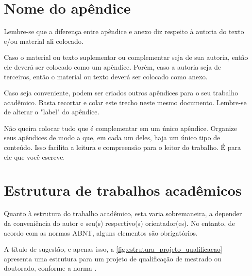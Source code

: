 
\begin{apendicesenv}
\partapendices


\chapter{Nome do apêndice}
\label{chap:apendice_a}

Lembre-se que a diferença entre apêndice e anexo diz respeito à autoria do texto e/ou material ali colocado.

Caso o material ou texto suplementar ou complementar seja de sua autoria, então ele deverá ser colocado como um apêndice. Porém, caso a autoria seja de terceiros, então o material ou texto deverá ser colocado como anexo.

Caso seja conveniente, podem ser criados outros apêndices para o seu trabalho acadêmico. Basta recortar e colar este trecho neste mesmo documento. Lembre-se de alterar o "label"{} do apêndice.

Não queira colocar tudo que é complementar em um único apêndice. Organize seus apêndices de modo a que, em cada um deles, haja um único tipo de conteúdo. Isso facilita a leitura e compreensão para o leitor do trabalho. É para ele que você escreve.


\chapter{Estrutura de trabalhos acadêmicos}
\label{chap:estrutura_de_trabalhos_academicos}

Quanto à estrutura do trabalho acadêmico, esta varia sobremaneira, a depender da conveniência do autor e seu(s) respectivo(s) orientador(es). No entanto, de acordo com as normas ABNT, alguns elementos são obrigatórios.

A título de sugestão, e apenas isso, a \autoref{fig:estrutura_projeto_qualificacao} apresenta uma estrutura para um projeto de qualificação de mestrado ou doutorado, conforme a norma .


\end{apendicesenv}
